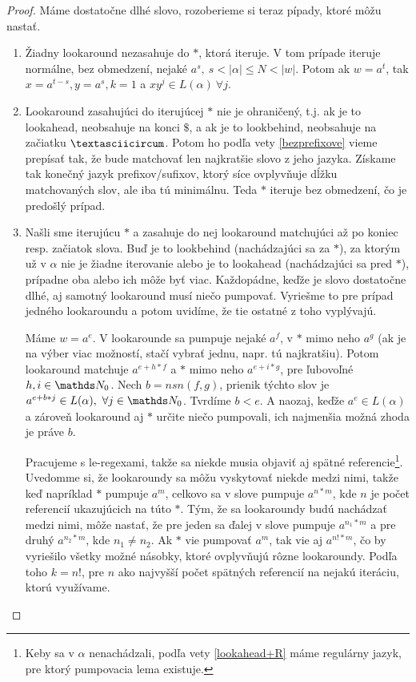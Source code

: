 \begin{proof}
Máme dostatočne dlhé slovo, rozoberieme si teraz pípady, ktoré môžu nastať. 
\begin{enumerate}
\item Žiadny lookaround nezasahuje do $*$, ktorá iteruje. V tom prípade iteruje normálne, bez obmedzení, nejaké $a^s, ~ s<\vert \alpha \vert \leq N < \vert w \vert$. Potom ak $w=a^t$, tak $x=a^{t-s},y=a^s, k=1$ a $xy^j \in L(\alpha) ~ \forall j$. 
\item Lookaround zasahujúci do iterujúcej $*$ nie je ohraničený, t.j. ak je to lookahead, neobsahuje na konci $\mathdollar$, a ak je to lookbehind, neobsahuje na začiatku $\textasciicircum$. Potom ho podľa vety \ref{bezprefixove} vieme prepísať tak, že bude matchovať len najkratšie slovo z jeho jazyka. Získame tak konečný jazyk prefixov/sufixov, ktorý síce ovplyvňuje dĺžku matchovaných slov, ale iba tú minimálnu. Teda $*$ iteruje bez obmedzení, čo je predošlý prípad.
\item Našli sme iterujúcu $*$ a zasahuje do nej lookaround matchujúci až po koniec resp. začiatok slova. Buď je to lookbehind (nachádzajúci sa za $*$), za ktorým už v $\alpha$ nie je žiadne iterovanie alebo je to lookahead (nachádzajúci sa pred $*$), prípadne oba alebo ich môže byť viac. Každopádne, keďže je slovo dostatočne dlhé, aj samotný lookaround musí niečo pumpovať. Vyriešme to pre prípad jedného lookaroundu a potom uvidíme, že tie ostatné z toho vyplývajú.

Máme $w=a^e$. V lookarounde sa pumpuje nejaké $a^f$, v $*$ mimo neho $a^g$ (ak je na výber viac možností, stačí vybrať jednu, napr. tú najkratšiu). Potom lookaround matchuje $a^{e+h*f}$ a $*$ mimo neho $a^{e+i*g}$, pre ľubovoľné $h,i \in \N_0$. Nech $b = nsn(f,g)$, prienik týchto slov je $a^{e+b*j} \in L(\alpha), ~ \forall j \in \N_0$. Tvrdíme $b<e$. A naozaj, keďže $a^e \in L(\alpha)$ a zároveň lookaround aj $*$ určite niečo pumpovali, ich najmenšia možná zhoda je práve $b$.

Pracujeme s le-regexami, takže sa niekde musia objaviť aj spätné referencie\footnote{Keby sa v $\alpha$ nenachádzali, podľa vety \ref{lookahead+R} máme regulárny jazyk, pre ktorý pumpovacia lema existuje.}. Uvedomme si, že lookaroundy sa môžu vyskytovať niekde medzi nimi, takže keď napríklad $*$ pumpuje $a^m$, celkovo sa v slove pumpuje $a^{n*m}$, kde $n$ je počet referencií ukazujúcich na túto $*$. Tým, že sa lookaroundy budú nachádzať medzi nimi, môže nastať, že pre jeden sa ďalej v slove pumpuje $a^{n_1*m}$ a pre druhý $a^{n_2*m}$, kde $n_1 \neq n_2$. Ak $*$ vie pumpovať $a^m$, tak vie aj $a^{n!*m}$, čo by vyriešilo všetky možné násobky, ktoré ovplyvňujú rôzne lookaroundy. Podľa toho $k = n!$, pre $n$ ako najvyšší počet spätných referencií na nejakú iteráciu, ktorú využívame.


\end{enumerate}
\end{proof}
